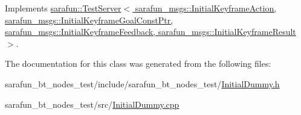 Implements \hyperlink{classsarafun_1_1TestServer_a85b9721105c2a4b46bae26428433513e}{sarafun\-::\-Test\-Server$<$ sarafun\-\_\-msgs\-::\-Initial\-Keyframe\-Action, sarafun\-\_\-msgs\-::\-Initial\-Keyframe\-Goal\-Const\-Ptr, sarafun\-\_\-msgs\-::\-Initial\-Keyframe\-Feedback, sarafun\-\_\-msgs\-::\-Initial\-Keyframe\-Result $>$}.



The documentation for this class was generated from the following files\-:\begin{DoxyCompactItemize}
\item 
sarafun\-\_\-bt\-\_\-nodes\-\_\-test/include/sarafun\-\_\-bt\-\_\-nodes\-\_\-test/\hyperlink{InitialDummy_8h}{Initial\-Dummy.\-h}\item 
sarafun\-\_\-bt\-\_\-nodes\-\_\-test/src/\hyperlink{InitialDummy_8cpp}{Initial\-Dummy.\-cpp}\end{DoxyCompactItemize}
